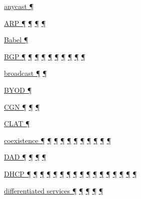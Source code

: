 \documentclass[
]{article}
\begin{document}
\hyperref[addresses]{anycast ¶}

\hyperref[address-resolution]{ARP ¶}
\hyperref[ipv6-primary-differences-from-ipv4]{¶}
\hyperref[layer-2-considerations]{¶} \hyperref[troubleshooting]{¶}

\hyperref[routing]{Babel ¶}

\hyperref[why-ipv6-is-so-complicated]{BGP ¶} \hyperref[addresses]{¶}
\hyperref[routing]{¶} \hyperref[tunnels]{¶} \hyperref[filtering]{¶}
\hyperref[multi-prefix-operation]{¶} \hyperref[multihoming]{¶}
\hyperref[routing-operation]{¶} \hyperref[tools]{¶}
\hyperref[further-reading]{¶}

\hyperref[managed-configuration]{broadcast ¶}
\hyperref[ipv6-primary-differences-from-ipv4]{¶}

\hyperref[address-and-prefix-management]{BYOD ¶}

\hyperref[dual-stack-scenarios]{CGN ¶} \hyperref[obsolete-techniques]{¶}
\hyperref[tunnels]{¶}

\hyperref[translation-and-ipv4-as-a-service]{CLAT ¶}

\hyperref[why-ipv6-is-so-complicated]{coexistence ¶}
\hyperref[coexistence-with-legacy-ipv4]{¶}
\hyperref[dual-stack-scenarios]{¶} \hyperref[obsolete-techniques]{¶}
\hyperref[translation-and-ipv4-as-a-service]{¶} \hyperref[tunnels]{¶}
\hyperref[network-design]{¶} \hyperref[energy-consumption]{¶}
\hyperref[multihoming]{¶} \hyperref[security-operation]{¶}
\hyperref[obsolete-features-in-ipv6]{¶}

\hyperref[address-resolution]{DAD ¶} \hyperref[auto-configuration]{¶}
\hyperref[layer-2-considerations]{¶}
\hyperref[address-and-prefix-management]{¶}

\hyperref[why-ipv6-is-so-complicated]{DHCP ¶}
\hyperref[auto-configuration]{¶} \hyperref[dns]{¶}
\hyperref[managed-configuration]{¶} \hyperref[routing]{¶}
\hyperref[source-and-destination-address-selection]{¶}
\hyperref[dual-stack-scenarios]{¶}
\hyperref[ipv6-primary-differences-from-ipv4]{¶} \hyperref[filtering]{¶}
\hyperref[layer-2-considerations]{¶} \hyperref[address-planning]{¶}
\hyperref[prefix-per-host]{¶}
\hyperref[address-and-prefix-management]{¶}
\hyperref[multi-prefix-operation]{¶} \hyperref[cern-and-the-lhc]{¶}
\hyperref[troubleshooting]{¶} \hyperref[advanced-troubleshooting]{¶}

\hyperref[why-ipv6-is-so-complicated]{differentiated services ¶}
\hyperref[packet-format]{¶} \hyperref[routing]{¶}
\hyperref[traffic-class-and-flow-label]{¶}
\hyperref[transport-protocols]{¶}
\end{document}
